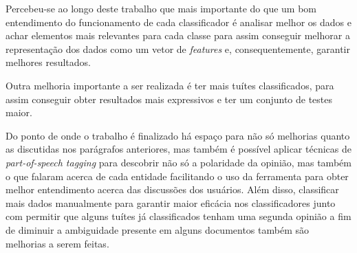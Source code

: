 Percebeu-se ao longo deste trabalho que mais importante do que um bom entendimento
do funcionamento de cada classificador é analisar melhor os dados e achar elementos
mais relevantes para cada classe para assim conseguir melhorar a representação dos dados
como um vetor de \textit{features} e, consequentemente, garantir melhores resultados.

Outra melhoria importante a ser realizada é ter mais tuítes classificados, para assim conseguir
obter resultados mais expressivos e ter um conjunto de testes maior.

Do ponto de onde o trabalho é finalizado há espaço para não só melhorias quanto as discutidas
nos parágrafos anteriores, mas também é possível aplicar técnicas de \textit{part-of-speech tagging}
\cite{pos2017}
para descobrir não só a polaridade da opinião, mas também o que falaram acerca de cada entidade
facilitando o uso da ferramenta para obter melhor entendimento acerca das discussões dos usuários.
Além disso, classificar mais dados manualmente para garantir maior eficácia nos classificadores
junto com permitir que alguns tuítes já classificados tenham uma segunda opinião a fim de
diminuir a ambiguidade presente em alguns documentos também são melhorias a serem feitas.
